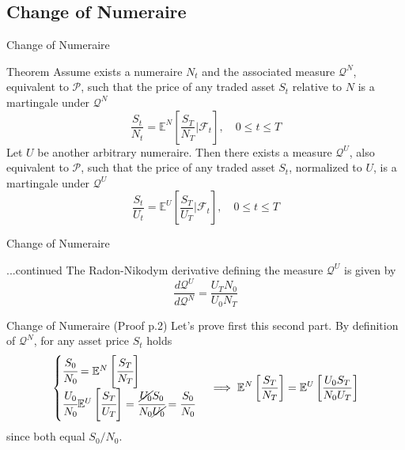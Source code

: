 \documentclass{beamer}
\begin{document}
\subsection{Change of Numeraire}
\begin{frame}{Change of Numeraire}
  \begin{block}{Theorem}
    Assume exists a numeraire $N_t$ and the associated measure $\mathcal{Q}^N$, equivalent to $\mathcal{P}$, such that the price of any traded asset $S_t$ relative to $N$ is a martingale under $\mathcal{Q}^N$
    \begin{equation*}
      \frac{S_t}{N_t} = \mathbb{E}^N\left[\frac{S_T}{N_T}\bigg|\mathcal{F}_t\right],\quad 0\le t \le T
    \end{equation*}
    Let $U$ be another arbitrary numeraire. Then there exists a measure $\mathcal{Q}^U$, also equivalent to $\mathcal{P}$, such that the price of any traded asset $S_t$, normalized to $U$, is a martingale under $\mathcal{Q}^U$
    \begin{equation*}
      \frac{S_t}{U_t} = \mathbb{E}^U\left[\frac{S_T}{U_T}\bigg|\mathcal{F}_t\right],\quad 0\le t \le T
    \end{equation*}
  \end{block}
\end{frame}	

\begin{frame}{Change of Numeraire}
  \begin{block}{...continued}
    The Radon-Nikodym derivative defining the measure $\mathcal{Q}^U$ is given by
    \begin{equation}
      \frac{d\mathcal{Q}^U}{d\mathcal{Q}^N} = \frac{U_T N_0}{U_0 N_T}
      \label{eq:radon_nikodym_der2}
    \end{equation}
  \end{block}
\end{frame}

\begin{frame}{Change of Numeraire (Proof p.2)}
  Let's prove first this second part.
  By definition of $\mathcal{Q}^N$, for any asset price $S_t$ holds
  \begin{equation*}
    \begin{cases}
      \cfrac{S_0}{N_0} = 
      \mathbb{E}^N\left[\cfrac{S_T}{N_T}\right] \\
      \cfrac{U_0}{N_0}\mathbb{E}^U\left[\cfrac{S_T}{U_T}\right] = \cfrac{\cancel{U_0} S_0}{N_0 \cancel{U_0}} = \cfrac{S_0}{N_0}
    \end{cases}\implies \mathbb{E}^N\left[\frac{S_T}{N_T}\right] = \mathbb{E}^U\left[\frac{U_0 S_T}{N_0 U_T}\right]
  \end{equation*}
  since both equal $S_0/N_0$. 
\end{frame}
\end{document}
